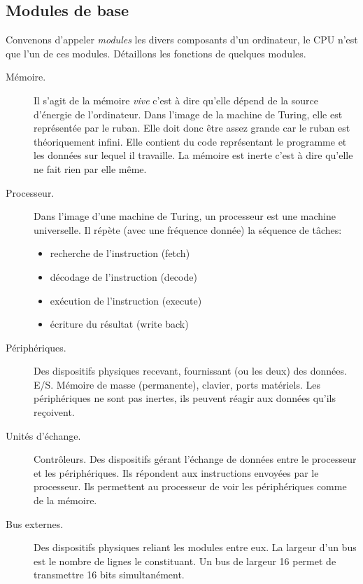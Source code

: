 \subsection{Modules de base}
Convenons d'appeler \emph{modules} les divers composants d'un ordinateur, le CPU n'est que l'un de ces modules. Détaillons les fonctions de quelques modules.
\begin{description}
 \item[Mémoire.] Il s'agit de la mémoire \emph{vive} c'est à dire qu'elle dépend de la source d'énergie de l'ordinateur. Dans l'image de la machine de Turing, elle est représentée par le ruban. Elle doit donc être assez grande car le ruban est théoriquement infini. Elle contient du code représentant le programme et les données sur lequel il travaille. La mémoire est inerte c'est à dire qu'elle ne fait rien par elle même.
\item[Processeur.] Dans l'image d'une machine de Turing, un processeur est une machine universelle. Il répète (avec une fréquence donnée) la séquence de tâches:
 \begin{itemize}
  \item recherche de l'instruction (fetch)
  \item décodage de l'instruction (decode)
  \item exécution de l'instruction (execute)
  \item écriture du résultat (write back)
 \end{itemize}
 \item[Périphériques.] Des dispositifs physiques recevant, fournissant (ou les deux) des données. E/S. Mémoire de masse (permanente), clavier, ports matériels. Les périphériques ne sont pas inertes, ils peuvent réagir aux données qu'ils reçoivent. 
 
 \item[Unités d'échange.]Contrôleurs. Des dispositifs gérant l'échange de données entre le processeur et les périphériques. Ils répondent aux instructions envoyées par le processeur. Ils permettent au processeur de voir les périphériques comme de la mémoire.
 
 \item[Bus externes.] Des dispositifs physiques reliant les modules entre eux. La largeur d'un bus est le nombre de lignes le constituant. Un bus de largeur 16 permet de transmettre 16 bits simultanément.
\end{description}

